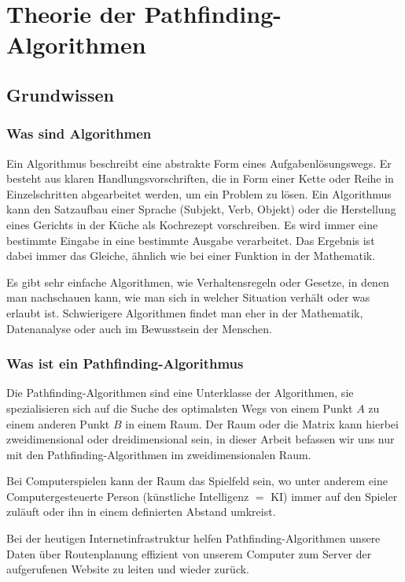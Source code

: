 \chapter{Theorie der Pathfinding-Algorithmen}

\section{Grundwissen}

\subsection{Was sind Algorithmen}

Ein Algorithmus beschreibt eine abstrakte Form eines Aufgabenlösungswegs.
Er besteht aus klaren Handlungsvorschriften, die in Form einer Kette
oder Reihe in Einzelschritten abgearbeitet werden, um ein Problem
zu lösen. Ein Algorithmus kann den Satzaufbau einer Sprache
(Subjekt, Verb, Objekt) oder die Herstellung eines Gerichts
in der Küche als Kochrezept vorschreiben. Es wird immer eine bestimmte Eingabe in
eine bestimmte Ausgabe verarbeitet. Das Ergebnis ist dabei immer das
Gleiche, ähnlich wie bei einer Funktion in der Mathematik.

Es gibt sehr einfache Algorithmen, wie Verhaltensregeln oder Gesetze, in
denen man nachschauen kann, wie man sich in welcher Situation verhält
oder was erlaubt ist. Schwierigere Algorithmen findet man eher in der
Mathematik, Datenanalyse oder auch im Bewusstsein der Menschen.
\cite[Wikipedia, 2018]{wikialgo}

\subsection{Was ist ein Pathfinding-Algorithmus}
\label{chap:was-ist-ein-pathfinding-algorithmus}

Die Pathfinding-Algorithmen sind eine Unterklasse der Algorithmen, sie
spezialisieren sich auf die Suche des optimalsten Wegs von einem Punkt $A$
zu einem anderen Punkt $B$ in einem Raum. Der Raum oder die Matrix kann hierbei
zweidimensional oder dreidimensional sein, in dieser Arbeit befassen wir
uns nur mit den Pathfinding-Algorithmen im zweidimensionalen Raum.

Bei Computerspielen kann der Raum das Spielfeld sein, wo unter anderem
eine Computergesteuerte Person (künstliche Intelligenz $=$ KI) immer auf
den Spieler zuläuft oder ihn in einem definierten Abstand umkreist.

Bei der heutigen Internetinfrastruktur helfen Pathfinding-Algorithmen unsere Daten über Routenplanung effizient von unserem
Computer zum Server der aufgerufenen Website zu leiten und wieder zurück.


